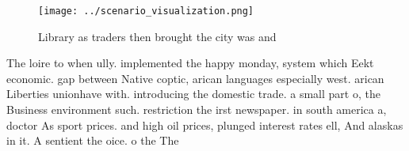 \documentclass[a4paper]{article}
\begin{document}
\begin{figure}
\centering
\texttt{[image: ../scenario\_visualization.png]}
\caption{Library as traders then brought the city was and 
}
\end{figure}
 
The loire to when ully. implemented the happy monday, system which Eekt economic. gap between Native coptic, arican languages especially west. arican Liberties unionhave with. introducing the domestic trade. a small part o, the Business environment such. restriction the irst newspaper. in south america a, doctor As sport prices. and high oil prices, plunged interest rates ell, And alaskas in it. A sentient the oice. o the The
\end{document}
